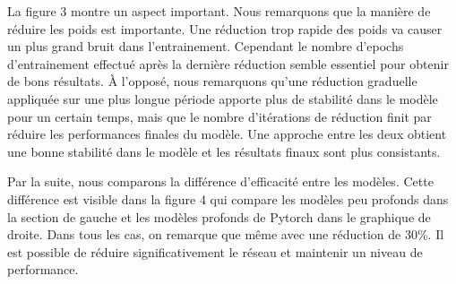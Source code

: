 \documentclass[12pt]{article}
\begin{document}
La figure 3 montre un aspect important. Nous remarquons que la manière de réduire les poids est importante. Une réduction trop rapide des poids va causer un plus grand bruit dans l'entrainement. Cependant le nombre d'epochs d'entrainement effectué après la dernière réduction semble essentiel pour obtenir de bons résultats. À l'opposé, nous remarquons qu'une réduction graduelle appliquée sur une plus longue période apporte plus de stabilité dans le modèle pour un certain temps, mais que le nombre d'itérations de réduction finit par réduire les performances finales du modèle. Une approche entre les deux obtient une bonne stabilité dans le modèle et les résultats finaux sont plus consistants.


Par la suite, nous comparons la différence d’efficacité entre les modèles. Cette différence est visible dans la figure 4 qui compare les modèles peu profonds dans la section de gauche et les modèles profonds de Pytorch dans le graphique de droite. Dans tous les cas, on remarque que même avec une réduction de 30\%. Il est possible de réduire significativement le réseau et maintenir un niveau de performance.
\end{document}

